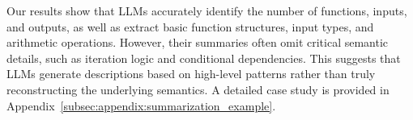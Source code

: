 Our results show that LLMs accurately identify the number of functions, inputs, and outputs, as well as extract basic function structures, input types, and arithmetic operations. However, their summaries often omit critical semantic details, such as iteration logic and conditional dependencies. This suggests that LLMs generate descriptions based on high-level patterns rather than truly reconstructing the underlying semantics. A detailed case study is provided in Appendix~\ref{subsec:appendix:summarization_example}.


\begin{table}[t]
\centering
\setlength\tabcolsep{2pt} %
\renewcommand{\arraystretch}{1.2} %
\caption{Performance comparison of LLMs in the code summarization task, including task completion and evaluation scores (BLEU, ROUGE-L, METEOR).}
\label{tab:codesummary_result}

\end{table}

